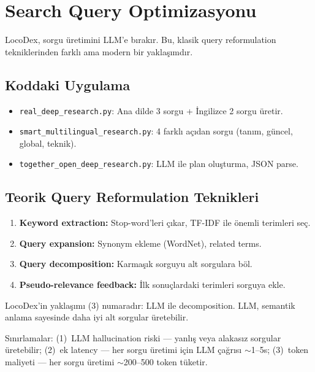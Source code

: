 \section{Search Query Optimizasyonu}
\label{sec:query-optimizasyon}

LocoDex, sorgu \"{u}retimini LLM'e b{\i}rak{\i}r. Bu, klasik query reformulation tekniklerinden farkl{\i} ama modern bir yakla\c{s}{\i}md{\i}r.

\subsection{Koddaki Uygulama}

\begin{itemize}
  \item \texttt{real\_deep\_research.py}: Ana dilde 3 sorgu + \.{I}ngilizce 2 sorgu \"{u}retir.
  \item \texttt{smart\_multilingual\_research.py}: 4 farkl{\i} a\c{c}{\i}dan sorgu (tan{\i}m, g\"{u}ncel, global, teknik).
  \item \texttt{together\_open\_deep\_research.py}: LLM ile plan olu\c{s}turma, JSON parse.
\end{itemize}

\subsection{Teorik Query Reformulation Teknikleri}

\begin{enumerate}
  \item \textbf{Keyword extraction:} Stop-word'leri \c{c}{\i}kar, TF-IDF ile \"{o}nemli terimleri se\c{c}.
  \item \textbf{Query expansion:} Synonym ekleme (WordNet), related terms.
  \item \textbf{Query decomposition:} Karma\c{s}{\i}k sorguyu alt sorgulara b\"{o}l.
  \item \textbf{Pseudo-relevance feedback:} \.{I}lk sonu\c{c}lardaki terimleri sorguya ekle.
\end{enumerate}

\noindent
LocoDex'in yakla\c{s}{\i}m{\i} (3) numarad{\i}r: LLM ile decomposition. LLM, semantik anlama sayesinde daha iyi alt sorgular \"{u}retebilir.

\begin{dikkat}
S{\i}n{\i}rlamalar: (1)~LLM hallucination riski --- yanl{\i}\c{s} veya alakas{\i}z sorgular \"{u}retebilir; (2)~ek latency --- her sorgu \"{u}retimi i\c{c}in LLM \c{c}a\u{g}r{\i}s{\i} $\sim$1--5s; (3)~token maliyeti --- her sorgu \"{u}retimi $\sim$200--500 token t\"{u}ketir.
\end{dikkat}


